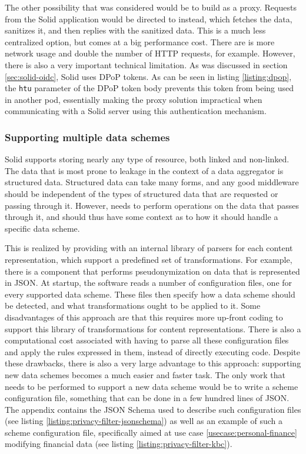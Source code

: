 The other possibility that was considered would be to build \middleware{} as a proxy. Requests from the Solid application would be directed to \middleware{} instead, which fetches the data, sanitizes it, and then replies with the sanitized data. This is a much less centralized option, but comes at a big performance cost. There are is more network usage and double the number of HTTP requests, for example. However, there is also a very important technical limitation. As was discussed in section \ref{sec:solid-oidc}, Solid uses \gls{DPoP} tokens. As can be seen in listing \ref{listing:dpop}, the \texttt{htu} parameter of the \gls{DPoP} token body prevents this token from being used in another pod, essentially making the proxy solution impractical when communicating with a Solid server using this authentication mechanism.


\subsubsection{Supporting multiple data schemes}
Solid supports storing nearly any type of resource, both linked and non-linked. The data that is most prone to leakage in the context of a data aggregator is structured data. Structured data can take many forms, and any good middleware should be independent of the types of structured data that are requested or passing through it. However, \middleware{} needs to perform operations on the data that passes through it, and should thus have some context as to how it should handle a specific data scheme.

This is realized by providing \middleware{} with an internal library of parsers for each content representation, which support a predefined set of transformations. For example, there is a component that performs pseudonymization on data that is represented in JSON. At startup, the software reads a number of configuration files, one for every supported data scheme. These files then specify how a data scheme should be detected, and what transformations ought to be applied to it. Some disadvantages of this approach are that this requires more up-front coding to support this library of transformations for content representations. There is also a computational cost associated with having to parse all these configuration files and apply the rules expressed in them, instead of directly executing code. Despite these drawbacks, there is also a very large advantage to this approach: supporting new data schemes becomes a much easier and faster task. The only work that needs to be performed to support a new data scheme would be to write a scheme configuration file, something that can be done in a few hundred lines of JSON. The appendix contains the JSON Schema used to describe such configuration files (see listing \ref{listing:privacy-filter-jsonschema}) as well as an example of such a scheme configuration file, specifically aimed at use case \ref{usecase:personal-finance} modifying financial data (see listing \ref{listing:privacy-filter-kbc}).

